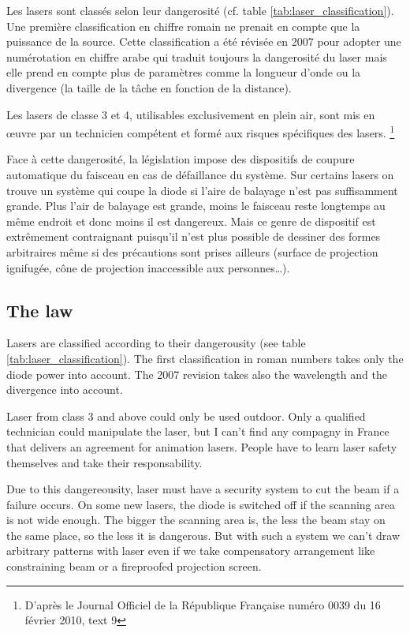 \begin{appendices}
\begin{fr}
Les lasers sont classés selon leur dangerosité (cf. table \ref{tab:laser_classification}).
Une première classification en chiffre romain ne prenait en compte que la puissance de la source.
Cette classification a été révisée en 2007 pour adopter une numérotation en chiffre arabe qui traduit toujours la dangerosité du laser mais elle prend en compte plus de paramètres comme la longueur d'onde ou la divergence (la taille de la tâche en fonction de la distance).

Les lasers de classe 3 et 4, utilisables exclusivement en plein air, sont mis en \oe uvre par un technicien compétent et formé aux risques spécifiques des lasers. 
\footnote{D'après le Journal Officiel de la République Française numéro 0039 du 16 février 2010, text 9}

Face à cette dangerosité, la législation impose des dispositifs de coupure automatique du faisceau en cas de défaillance du système.
Sur certains lasers on trouve un système qui coupe la diode si l'aire de balayage n'est pas suffisamment grande. 
Plus l'air de balayage est grande, moins le faisceau reste longtemps au même endroit et donc moins il est dangereux. 
Mais ce genre de dispositif est extrêmement contraignant puisqu'il n'est plus possible de dessiner des formes arbitraires 
même si des précautions sont prises ailleurs (surface de projection ignifugée, cône de projection inaccessible aux personnes\dots).
\end{fr}

\begin{en}
\subsection*{The law}
Lasers are classified according to their dangerousity (see table \ref{tab:laser_classification}).
The first classification in roman numbers takes only the diode power into account.
The 2007 revision takes also the wavelength and the divergence into account.

Laser from class 3 and above could only be used outdoor.
Only a qualified technician could manipulate the laser, but I can't find any compagny in France that delivers an agreement for animation lasers.
People have to learn laser safety themselves and take their responsability.

Due to this dangereousity, laser must have a security system to cut the beam if a failure occurs.
On some new lasers, the diode is switched off if the scanning area is not wide enough.
The bigger the scanning area is, the less the beam stay on the same place, so the less it is dangerous.
But with such a system we can't draw arbitrary patterns with laser even if we take compensatory arrangement like constraining beam or a fireproofed projection screen.


\end{en}
\end{appendices}
